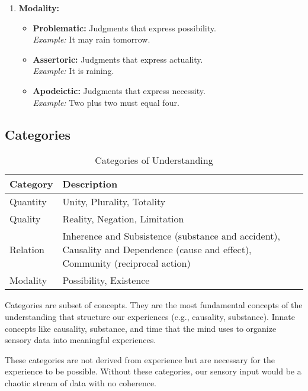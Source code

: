 \documentclass[a4paper]{article}
\begin{document}
\begin{enumerate}
\begin{itemize}
    \end{itemize}
    \item \textbf{Modality:}
    \begin{itemize}
        \item \textbf{Problematic:} Judgments that express possibility. \\
        \textit{Example:} It may rain tomorrow.
        \item \textbf{Assertoric:} Judgments that express actuality. \\
        \textit{Example:} It is raining.
        \item \textbf{Apodeictic:} Judgments that express necessity. \\
        \textit{Example:} Two plus two must equal four.
    \end{itemize}
\end{enumerate}


\subsection{Categories}

\begin{table}[h!]
    \centering
    \begin{tabular}{|p{2cm}|p{10cm}|}
    \hline
    \textbf{Category} & \textbf{Description} \\
    \hline
    Quantity & Unity, Plurality, Totality \\
    \hline
    Quality & Reality, Negation, Limitation \\
    \hline
    Relation & Inherence and Subsistence (substance and accident), Causality and Dependence (cause and effect), Community (reciprocal action) \\
    \hline
    Modality & Possibility, Existence \\
    \hline
    \end{tabular}
    \caption{Categories of Understanding}
    \label{tab:categories}
\end{table}

Categories are subset of concepts.
They are the most fundamental concepts of the understanding that structure our experiences (e.g., causality, substance).
Innate concepts like causality, substance, and time that the mind uses to organize sensory data into meaningful experiences.

These categories are not derived from experience but are necessary for the experience to be possible. 
Without these categories, our sensory input would be a chaotic stream of data with no coherence. 
\end{document}
